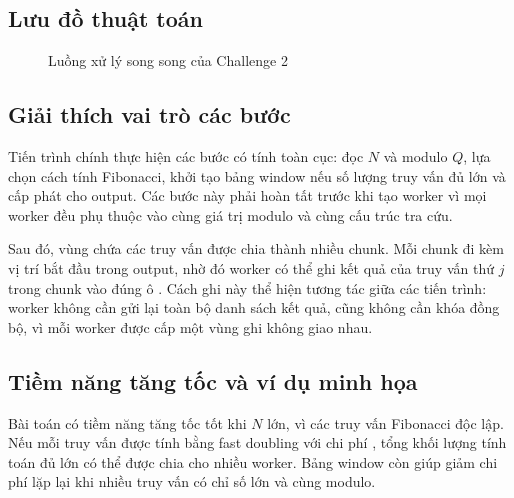 \subsection{Lưu đồ thuật toán}
\begin{figure}[H]
\centering
{}
\caption{Luồng xử lý song song của Challenge 2}
\label{fig:challenge2-flow}
\end{figure}

\subsection{Giải thích vai trò các bước}
Tiến trình chính thực hiện các bước có tính toàn cục: đọc $N$ và modulo $Q$, lựa chọn cách tính Fibonacci, khởi tạo bảng window nếu số lượng truy vấn đủ lớn và cấp phát  cho output. Các bước này phải hoàn tất trước khi tạo worker vì mọi worker đều phụ thuộc vào cùng giá trị modulo và cùng cấu trúc tra cứu.

Sau đó, vùng chứa các truy vấn được chia thành nhiều chunk. Mỗi chunk đi kèm vị trí bắt đầu trong output, nhờ đó worker có thể ghi kết quả của truy vấn thứ $j$ trong chunk vào đúng ô . Cách ghi này thể hiện tương tác giữa các tiến trình: worker không cần gửi lại toàn bộ danh sách kết quả, cũng không cần khóa đồng bộ, vì mỗi worker được cấp một vùng ghi không giao nhau.

\subsection{Tiềm năng tăng tốc và ví dụ minh họa}
Bài toán có tiềm năng tăng tốc tốt khi $N$ lớn, vì các truy vấn Fibonacci độc lập. Nếu mỗi truy vấn được tính bằng fast doubling với chi phí , tổng khối lượng tính toán đủ lớn có thể được chia cho nhiều worker. Bảng window còn giúp giảm chi phí lặp lại khi nhiều truy vấn có chỉ số lớn và cùng modulo.

